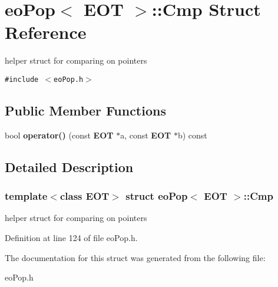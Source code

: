 \section{eo\-Pop$<$ EOT $>$::Cmp Struct Reference}
\label{structeo_pop_1_1_cmp}
helper struct for comparing on pointers  


{\tt \#include $<$eo\-Pop.h$>$}

\subsection*{Public Member Functions}
\begin{CompactItemize}
\item 
bool {\bf operator()} (const {\bf EOT} $\ast$a, const {\bf EOT} $\ast$b) const \label{structeo_pop_1_1_cmp_a0}

\end{CompactItemize}


\subsection{Detailed Description}
\subsubsection*{template$<$class EOT$>$ struct eo\-Pop$<$ EOT $>$::Cmp}

helper struct for comparing on pointers 



Definition at line 124 of file eo\-Pop.h.

The documentation for this struct was generated from the following file:\begin{CompactItemize}
\item 
eo\-Pop.h\end{CompactItemize}
